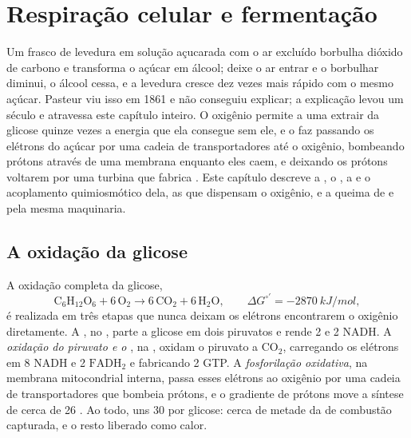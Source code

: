\chapter{Respiração celular e fermentação}\label{ch:b1:respiration-fermentation}

Um frasco de levedura em solução açucarada com o ar excluído borbulha
dióxido de carbono e transforma o açúcar em álcool; deixe o ar entrar e
o borbulhar diminui, o álcool cessa, e a levedura cresce dez vezes mais
rápido com o mesmo açúcar. Pasteur viu isso em 1861 e não conseguiu
explicar; a explicação levou um século e atravessa este capítulo
inteiro. O oxigênio permite a uma  extrair da glicose quinze vezes
a energia que ela consegue sem ele, e o faz passando os elétrons do
açúcar por uma cadeia de transportadores até o oxigênio, bombeando
prótons através de uma membrana enquanto eles caem, e deixando os
prótons voltarem por uma turbina que fabrica . Este capítulo descreve
a , o , a  e o acoplamento
quimiosmótico dela, as  que dispensam o oxigênio, e a
queima de  e  pela mesma maquinaria.

\section{A oxidação da glicose}

\begin{proposition}\label{prop:b1:respiration-fermentation:overview}
A oxidação completa da glicose,
\[
\mathrm{C_6H_{12}O_6} + 6\,\mathrm{O_2} \to 6\,\mathrm{CO_2} + 6\,\mathrm{H_2O},
\qquad \Delta G^{\circ\prime} = \qty{-2870}{kJ/mol},
\]
é realizada em três etapas que nunca deixam os elétrons encontrarem o
oxigênio diretamente. A \emph{}, no , parte a glicose em
dois piruvatos e rende 2  e 2 NADH. A \emph{oxidação do piruvato e o
}, na , oxidam o piruvato a
$\mathrm{CO_2}$, carregando os elétrons em 8 NADH e 2
$\mathrm{FADH_2}$ e fabricando 2 GTP. A \emph{fosforilação oxidativa},
na membrana mitocondrial interna, passa esses elétrons ao oxigênio por
uma cadeia de transportadores que bombeia prótons, e o gradiente de
prótons move a síntese de cerca de 26 . Ao todo, uns 30  por
glicose: cerca de metade da  de combustão capturada, e o
resto liberado como calor.
\end{proposition}

